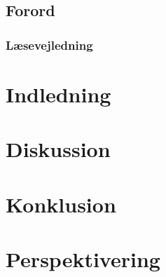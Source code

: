 

\listoffixmes
\clearpage




\clearpage

\clearpage

\section*{Forord}

\subsection*{Læsevejledning}

\clearpage

\renewcommand*\contentsname{Indholdsfortegnelse}
\tableofcontents
\clearpage

\chapter{Indledning}



\clearpage







\chapter{Diskussion}

\clearpage

\chapter{Konklusion}

\clearpage

\chapter{Perspektivering}

\clearpage

%

\clearpage

\listoffigures
\clearpage

\listoftables
\clearpage

\lstlistoflistings
\clearpage




